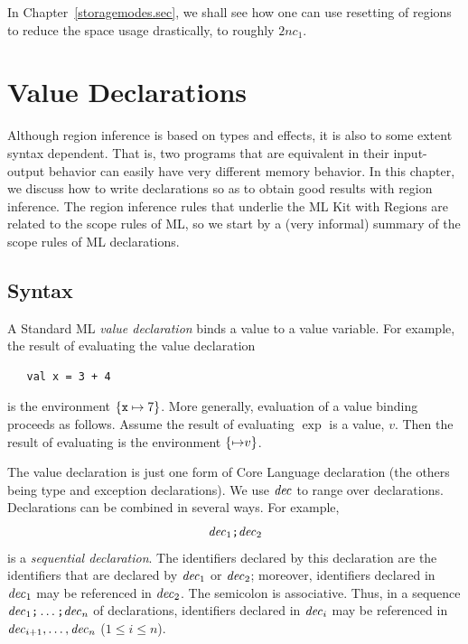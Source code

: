 \documentclass[12pt]{book}
\begin{document}
In Chapter~\ref{storagemodes.sec}, we shall see how one can use
resetting of regions to reduce the space usage drastically, to roughly
$2nc_1$.  
%

\chapter{Value Declarations}
\label{valdecl.sec}

Although region inference is based on types and effects, it is also to
some extent syntax dependent. That is, two programs that are
equivalent in their input-output behavior can easily have very
different memory behavior. In this chapter, we discuss how to write
%
declarations so as to obtain good results with region inference. The
region inference rules that underlie the ML Kit with Regions are
related to the scope rules of ML, so we start by a (very informal)
summary of the scope rules of ML declarations.

\section{Syntax}
A Standard ML {\em value declaration} binds a value to a value
%
variable. For example, the result of evaluating the value declaration
\begin{verbatim}
   val x = 3 + 4
\end{verbatim}
is the 
%
environment $\{\hbox{\tt x}\mapsto 7\}$. More generally, evaluation of a
value binding  proceeds as follows. Assume
the result of evaluating $\exp$ is a value, $v$.  Then the result of
evaluating  is the environment $\{{\it \mapsto}
v\}$.

The value declaration is just one form of Core Language declaration 
(the others being type and exception declarations). We use ${\it dec}$ to
range over declarations. Declarations can be
combined in several ways. For example, 
%
$${\it dec}_1\hbox{\tt ;}{\it dec}_2$$
is a {\em sequential declaration}. The
identifiers declared by this declaration are the identifiers that are
declared by ${\it dec}_1$ or ${\it dec}_2$; moreover, identifiers declared in
${\it dec}_1$ may be referenced in ${\it dec}_2$. The
%
semicolon is associative. Thus, in a sequence
${\it dec}_1\hbox{\tt ;}\ldots\hbox{\tt ;}{\it dec}_n$ of declarations, identifiers
declared in ${\it dec}_i$ may be referenced in ${\it dec}_{i+1},\ldots ,{\it dec}_n$
($1\leq i\leq n$).
\end{document}
